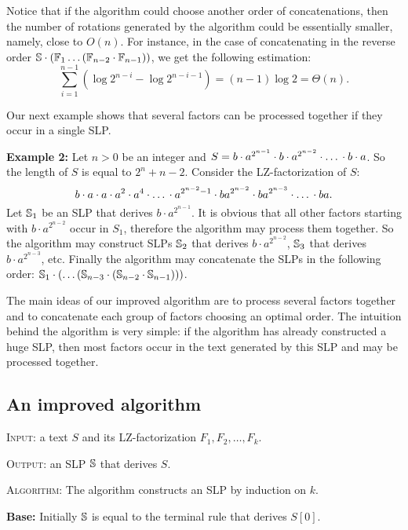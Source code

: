 \documentclass[10pt]{article}
\begin{document}
Notice that if the algorithm could choose another order of concatenations, then the number of rotations generated by the
algorithm could be essentially smaller, namely, close to $O(n)$. For instance, in the case of concatenating in the
reverse order $\mathbb{S} \cdot (\mathbb{F}_1 \dots (\mathbb{F}_{n-2} \cdot \mathbb{F}_{n-1}))$, we get the following estimation:
$$\sum_{i=1}^{n-1} (\log{2^{n-i}} - \log{2^{n-i-1}}) = (n-1)\log{2} = \Theta(n).$$

Our next example shows that several factors can be processed together if they occur in a single SLP.

\noindent \textbf{Example 2:} Let $n > 0$ be an integer and $S = b\cdot a^{2^{n-1}}\cdot b \cdot a^{2^{n-2}} \cdot
\mbox{\dots} \cdot b \cdot a$. So the length of $S$ is equal to $2^n + n - 2$. Consider the LZ-factorization of $S$: $$
b \cdot a \cdot a \cdot a^2 \cdot a^4 \cdot \mbox{\dots} \cdot a^{2^{n-2} - 1} \cdot ba^{2^{n-2}} \cdot ba^{2^{n-3}}
\cdot \mbox{\dots} \cdot ba.$$ Let $\mathbb{S}_1$ be an SLP that derives $b \cdot a^{2^{n-1}}$. It is obvious that all
other factors starting with $b \cdot a^{2^{n-2}}$ occur in $S_1$, therefore the algorithm may process them together. So
the algorithm may construct SLPs $\mathbb{S}_2$ that derives $b \cdot a^{2^{n-2}}$, $\mathbb{S}_3$ that derives $b \cdot
a^{2^{n-3}}$, etc. Finally the algorithm may concatenate the SLPs in the following order:
$\mathbb{S}_1\cdot(\dots(\mathbb{S}_{n-3}\cdot(\mathbb{S}_{n-2} \cdot \mathbb{S}_{n-1})))$.

The main ideas of our improved  algorithm are to process several factors together and to concatenate each group of
factors choosing an optimal order. The intuition behind the algorithm is very simple: if the algorithm has already
constructed a huge SLP, then most factors occur in the text generated by this SLP and may be processed together.

\subsection{An improved algorithm}

\noindent \textsc{Input:} a text $S$ and its LZ-factorization $F_1, F_2, \dots, F_k$.

\noindent \textsc{Output:} an SLP $\mathbb{S}$ that derives $S$.

\noindent \textsc{Algorithm:} The algorithm constructs an SLP by induction on $k$.

\textbf{Base:} Initially $\mathbb{S}$ is equal to the terminal rule that derives $S[0]$.
\end{document}
